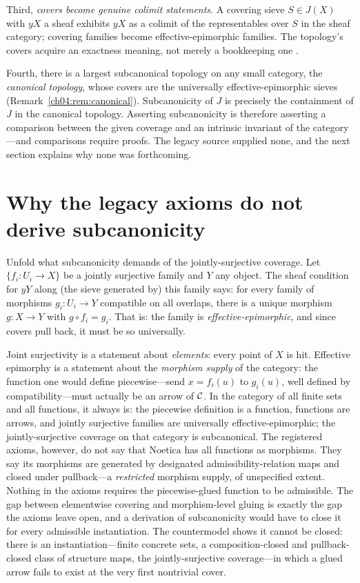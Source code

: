 Third, \emph{covers become genuine colimit statements}. A covering sieve
$S\in J(X)$ with $yX$ a sheaf exhibits $yX$ as a colimit of the
representables over $S$ in the sheaf category; covering families become
effective-epimorphic families. The topology's covers acquire an exactness
meaning, not merely a bookkeeping one \cite{maclane,johnstone}.

Fourth, there is a largest subcanonical topology on any small category, the
\emph{canonical topology}, whose covers are the universally
effective-epimorphic sieves (Remark~\ref{ch04:rem:canonical}). Subcanonicity
of $J$ is precisely the containment of $J$ in the canonical topology.
Asserting subcanonicity is therefore asserting a comparison between the
given coverage and an intrinsic invariant of the category---and comparisons
require proofs. The legacy source supplied none, and the next section
explains why none was forthcoming.

\section{Why the legacy axioms do not derive subcanonicity}
\label{ch06:sec:whynot}

Unfold what subcanonicity demands of the jointly-surjective coverage. Let
$\{f_i:U_i\to X\}$ be a jointly surjective family and $Y$ any object. The
sheaf condition for $yY$ along (the sieve generated by) this family says:
for every family of morphisms $g_i:U_i\to Y$ compatible on all overlaps,
there is a unique morphism $g:X\to Y$ with $g\circ f_i=g_i$. That is: the
family is \emph{effective-epimorphic}, and since covers pull back, it must
be so universally.

Joint surjectivity is a statement about \emph{elements}: every point of $X$
is hit. Effective epimorphy is a statement about the \emph{morphism supply}
of the category: the function one would define piecewise---send
$x=f_i(u)$ to $g_i(u)$, well defined by compatibility---must actually be an
arrow of $\mathcal{C}$. In the category of all finite sets and all functions, it
always is: the piecewise definition is a function, functions are arrows, and
jointly surjective families are universally effective-epimorphic; the
jointly-surjective coverage on that category is subcanonical. The registered
axioms, however, do not say that $\mathrm{Noetica}$ has all functions as
morphisms. They say its morphisms are generated by designated
admissibility-relation maps and closed under pullback---a \emph{restricted}
morphism supply, of unspecified extent. Nothing in the axioms requires the
piecewise-glued function to be admissible. The gap between
elementwise covering and morphism-level gluing is exactly the gap the
axioms leave open, and a derivation of subcanonicity would have to close it
for every admissible instantiation. The countermodel shows it cannot be
closed: there is an instantiation---finite concrete sets, a
composition-closed and pullback-closed class of structure maps, the
jointly-surjective coverage---in which a glued arrow fails to exist at the
very first nontrivial cover.

